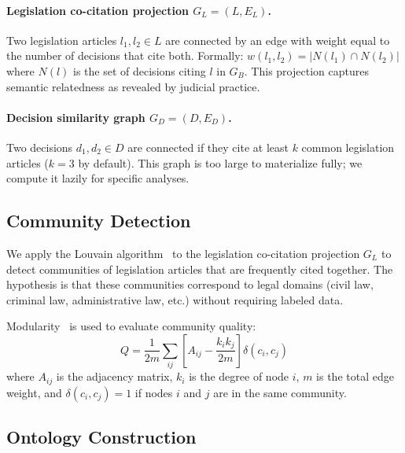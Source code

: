 \documentclass[11pt]{article}
\begin{document}
\paragraph{Legislation co-citation projection $G_L = (L, E_L)$.}
Two legislation articles $l_1, l_2 \in L$ are connected by an edge with weight equal to the number of decisions that cite both.
Formally: $w(l_1, l_2) = |N(l_1) \cap N(l_2)|$ where $N(l)$ is the set of decisions citing $l$ in $G_B$.
This projection captures semantic relatedness as revealed by judicial practice.

\paragraph{Decision similarity graph $G_D = (D, E_D)$.}
Two decisions $d_1, d_2 \in D$ are connected if they cite at least $k$ common legislation articles ($k=3$ by default).
This graph is too large to materialize fully; we compute it lazily for specific analyses.

\subsection{Community Detection}
\label{sec:communities}

We apply the Louvain algorithm~\citep{blondel2008louvain} to the legislation co-citation projection $G_L$ to detect communities of legislation articles that are frequently cited together.
The hypothesis is that these communities correspond to legal domains (civil law, criminal law, administrative law, etc.) without requiring labeled data.

Modularity~\citep{newman2004modularity} is used to evaluate community quality:
\begin{equation}
  Q = \frac{1}{2m} \sum_{ij} \left[ A_{ij} - \frac{k_i k_j}{2m} \right] \delta(c_i, c_j)
\end{equation}
where $A_{ij}$ is the adjacency matrix, $k_i$ is the degree of node $i$, $m$ is the total edge weight, and $\delta(c_i, c_j) = 1$ if nodes $i$ and $j$ are in the same community.

\subsection{Ontology Construction}
\label{sec:ontology}
\end{document}
